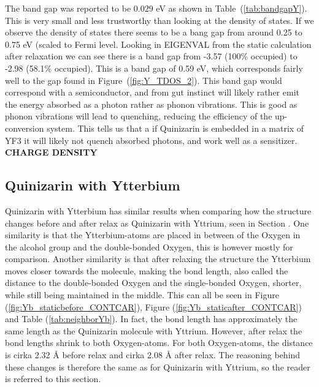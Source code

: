 \documentclass{article}
\begin{document}
    The band gap was reported to be $0.029$ eV as shown in Table~(\ref{tab:bandgapY}). This is very small and less trustworthy than looking at the density of states. If we observe the density of states there seems to be a bang gap from around 0.25 to 0.75 eV (scaled to Fermi level. Looking in EIGENVAL from the static calculation after relaxation we can see there is a band gap from -3.57 (100\% occupied) to -2.98 (58.1\% occupied). This is a band gap of 0.59 eV, which corresponds fairly well to the gap found in Figure~(\ref{fig:Y_TDOS_2}). This band gap would correspond with a semiconductor, and from gut instinct will likely rather emit the energy absorbed as a photon rather as phonon vibrations. This is good as phonon vibrations will lead to quenching, reducing the efficiency of the up-conversion system. This tells us that a if Quinizarin is embedded in a matrix of YF3 it will likely not quench absorbed photons, and work well as a sensitizer. \\

    \textbf{CHARGE DENSITY} \\


  \subsection{Quinizarin with Ytterbium}

    Quinizarin with Ytterbium has similar results when comparing how the structure changes before and after relax as Quinizarin with Yttrium, seen in Section . One similarity is that the Ytterbium-atoms are placed in between of the Oxygen in the alcohol group and the double-bonded Oxygen, this is however mostly for comparison. Another similarity is that after relaxing the structure the Ytterbium moves closer towards the molecule, making the bond length, also called the distance to the double-bonded Oxygen and the single-bonded Oxygen, shorter, while still being maintained in the middle. This can all be seen in Figure (\ref{fig:Yb_staticbefore_CONTCAR}), Figure (\ref{fig:Yb_staticafter_CONTCAR}) and Table (\ref{tab:neighborYb}). In fact, the bond length has approximately the same length as the Quinizarin molecule with Yttrium. However, after relax the bond lengths shrink to both Oxygen-atoms. For both Oxygen-atoms, the distance is cirka 2.32 Å before relax and cirka 2.08 Å after relax. The reasoning behind these changes is therefore the same as for Quinizarin with Yttrium, so the reader is referred to this section. \\
\end{document}
